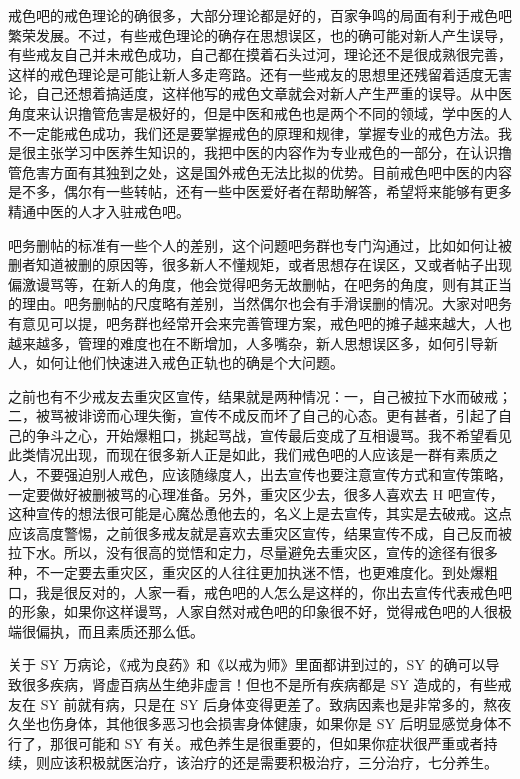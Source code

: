 戒色吧的戒色理论的确很多，大部分理论都是好的，百家争鸣的局面有利于戒色吧繁荣发展。不过，有些戒色理论的确存在思想误区，也的确可能对新人产生误导，有些戒友自己并未戒色成功，自己都在摸着石头过河，理论还不是很成熟很完善，这样的戒色理论是可能让新人多走弯路。还有一些戒友的思想里还残留着适度无害论，自己还想着搞适度，这样他写的戒色文章就会对新人产生严重的误导。从中医角度来认识撸管危害是极好的，但是中医和戒色也是两个不同的领域，学中医的人不一定能戒色成功，我们还是要掌握戒色的原理和规律，掌握专业的戒色方法。我是很主张学习中医养生知识的，我把中医的内容作为专业戒色的一部分，在认识撸管危害方面有其独到之处，这是国外戒色无法比拟的优势。目前戒色吧中医的内容是不多，偶尔有一些转帖，还有一些中医爱好者在帮助解答，希望将来能够有更多精通中医的人才入驻戒色吧。

吧务删帖的标准有一些个人的差别，这个问题吧务群也专门沟通过，比如如何让被删者知道被删的原因等，很多新人不懂规矩，或者思想存在误区，又或者帖子出现偏激谩骂等，在新人的角度，他会觉得吧务无故删帖，在吧务的角度，则有其正当的理由。吧务删帖的尺度略有差别，当然偶尔也会有手滑误删的情况。大家对吧务有意见可以提，吧务群也经常开会来完善管理方案，戒色吧的摊子越来越大，人也越来越多，管理的难度也在不断增加，人多嘴杂，新人思想误区多，如何引导新人，如何让他们快速进入戒色正轨也的确是个大问题。

之前也有不少戒友去重灾区宣传，结果就是两种情况：一，自己被拉下水而破戒；二，被骂被诽谤而心理失衡，宣传不成反而坏了自己的心态。更有甚者，引起了自己的争斗之心，开始爆粗口，挑起骂战，宣传最后变成了互相谩骂。我不希望看见此类情况出现，而现在很多新人正是如此，我们戒色吧的人应该是一群有素质之人，不要强迫别人戒色，应该随缘度人，出去宣传也要注意宣传方式和宣传策略，一定要做好被删被骂的心理准备。另外，重灾区少去，很多人喜欢去 H 吧宣传，这种宣传的想法很可能是心魔怂恿他去的，名义上是去宣传，其实是去破戒。这点应该高度警惕，之前很多戒友就是喜欢去重灾区宣传，结果宣传不成，自己反而被拉下水。所以，没有很高的觉悟和定力，尽量避免去重灾区，宣传的途径有很多种，不一定要去重灾区，重灾区的人往往更加执迷不悟，也更难度化。到处爆粗口，我是很反对的，人家一看，戒色吧的人怎么是这样的，你出去宣传代表戒色吧的形象，如果你这样谩骂，人家自然对戒色吧的印象很不好，觉得戒色吧的人很极端很偏执，而且素质还那么低。

关于 SY 万病论，《戒为良药》和《以戒为师》里面都讲到过的，SY 的确可以导致很多疾病，肾虚百病丛生绝非虚言！但也不是所有疾病都是 SY 造成的，有些戒友在 SY 前就有病，只是在 SY 后身体变得更差了。致病因素也是非常多的，熬夜久坐也伤身体，其他很多恶习也会损害身体健康，如果你是 SY 后明显感觉身体不行了，那很可能和 SY 有关。戒色养生是很重要的，但如果你症状很严重或者持续，则应该积极就医治疗，该治疗的还是需要积极治疗，三分治疗，七分养生。

